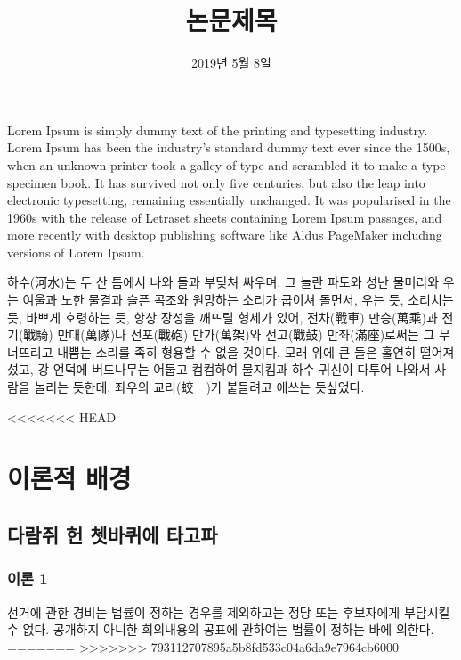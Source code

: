 \documentclass{thesis-SJ}
\title[English title]{논문제목}
\date{2019년 5월 8일}{May 8th, 2019}
\begin{document}
	\newpage
	\tableofcontents
	\listoftables
	\listoffigures
	
	
	\newpage
	\EnglishAbstract
	Lorem Ipsum is simply dummy text of the printing and typesetting industry. Lorem Ipsum has been the industry's standard dummy text ever since the 1500s, when an unknown printer took a galley of type and scrambled it to make a type specimen book. It has survived not only five centuries, but also the leap into electronic typesetting, remaining essentially unchanged. It was popularised in the 1960s with the release of Letraset sheets containing Lorem Ipsum passages, and more recently with desktop publishing software like Aldus PageMaker including versions of Lorem Ipsum.

	
	
	\KoreanAbstract
	하수(河水)는 두 산 틈에서 나와 돌과 부딪쳐 싸우며, 그 놀란 파도와 성난 물머리와 우는 여울과 노한 물결과 슬픈 곡조와 원망하는 소리가 굽이쳐 돌면서, 우는 듯, 소리치는 듯, 바쁘게 호령하는 듯, 항상 장성을 깨뜨릴 형세가 있어, 전차(戰車) 만승(萬乘)과 전기(戰騎) 만대(萬隊)나 전포(戰砲) 만가(萬架)와 전고(戰鼓) 만좌(滿座)로써는 그 무너뜨리고 내뿜는 소리를 족히 형용할 수 없을 것이다. 모래 위에 큰 돌은 홀연히 떨어져 섰고, 강 언덕에 버드나무는 어둡고 컴컴하여 물지킴과 하수 귀신이 다투어 나와서 사람을 놀리는 듯한데, 좌우의 교리(蛟　)가 붙들려고 애쓰는 듯싶었다.
	
	
	
	\mainpartstart
	\newpage
	
<<<<<<< HEAD
	\chapter{이론적 배경} 
	\section{다람쥐 헌 쳇바퀴에 타고파}
	\subsection{이론 1}
	선거에 관한 경비는 법률이 정하는 경우를 제외하고는 정당 또는 후보자에게 부담시킬 수 없다. 공개하지 아니한 회의내용의 공표에 관하여는 법률이 정하는 바에 의한다.
=======
>>>>>>> 793112707895a5b8fd533c04a6da9e7964cb6000
	
\end{document}
